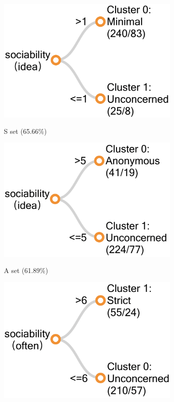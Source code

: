 %	
\begin{figure}
	\centering
	\begin{subfigure}[b]{0.4\linewidth}
		\includegraphics[width=0.5\linewidth]{figures/s_tree3new.png}
		\label{fig:stree3}
		\caption{S set (65.66\%)}
	\end{subfigure}
	\begin{subfigure}[b]{0.4\linewidth}  
		\includegraphics[width=0.5\linewidth]{figures/a_tree3new.png}
		\label{fig:atree3}
		\caption{A set (61.89\%)}
	\end{subfigure}
	\begin{subfigure}[b]{0.4\linewidth} 
		\includegraphics[width=0.5\linewidth]{figures/f_tree3new.png}

\end{subfigure}
\end{figure}
